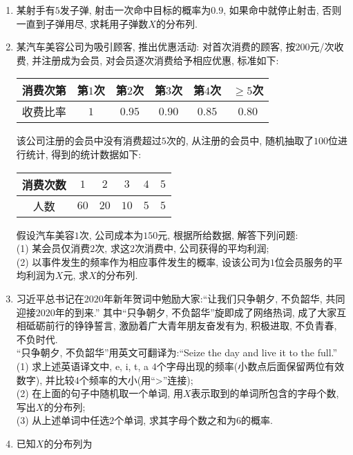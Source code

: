 \documentclass[10pt,a4paper]{article}
\begin{document}
\begin{enumerate}[1.]
\item 某射手有$5$发子弹, 射击一次命中目标的概率为$0.9$, 如果命中就停止射击, 否则一直到子弹用尽, 求耗用子弹数$X$的分布列.
\item 某汽车美容公司为吸引顾客, 推出优惠活动: 对首次消费的顾客, 按$200$元/次收费, 并注册成为会员, 对会员逐次消费给予相应优惠, 标准如下:\\
\begin{center}
    \begin{tabular}{|c|c|c|c|c|c|}
        \hline
        消费次第 & 第$1$次 & 第$2$次 & 第$3$次 & 第$4$次 & $\ge 5$次 \\ \hline
        收费比率 & $1$ & $0.95$ & $0.90$ & $0.85$ & $0.80$\\ \hline
    \end{tabular}
\end{center}
该公司注册的会员中没有消费超过$5$次的, 从注册的会员中, 随机抽取了$100$位进行统计, 得到的统计数据如下:
\begin{center}
    \begin{tabular}{|c|c|c|c|c|c|}
        \hline
        消费次数 & $1$ & $2$ & $3$ & $4$ & $5$ \\ \hline
        人数 & $60$ & $20$ & $10$ & $5$ & $5$\\ \hline
    \end{tabular}
\end{center}
假设汽车美容$1$次, 公司成本为$150$元, 根据所给数据, 解答下列问题:\\
(1) 某会员仅消费$2$次, 求这$2$次消费中, 公司获得的平均利润;\\
(2) 以事件发生的频率作为相应事件发生的概率, 设该公司为$1$位会员服务的平均利润为$X$元, 求$X$的分布列.
\item 习近平总书记在$2020$年新年贺词中勉励大家:``让我们只争朝夕, 不负韶华, 共同迎接$2020$年的到来.'' 其中``只争朝夕, 不负韶华''旋即成了网络热词, 成了大家互相砥砺前行的铮铮誓言, 激励着广大青年朋友奋发有为, 积极进取, 不负青春, 不负时代.\\
``只争朝夕, 不负韶华''用英文可翻译为:``Seize the day and live it to the full.''\\
(1) 求上述英语译文中, e, i, t, a $4$个字母出现的频率(小数点后面保留两位有效数字), 并比较$4$个频率的大小(用``>''连接);\\
(2) 在上面的句子中随机取一个单词, 用$X$表示取到的单词所包含的字母个数, 写出$X$的分布列;\\
(3) 从上述单词中任选$2$个单词, 求其字母个数之和为$6$的概率.
\item 已知$X$的分布列为
\begin{center}

\end{center}
\end{enumerate}
\end{document}
